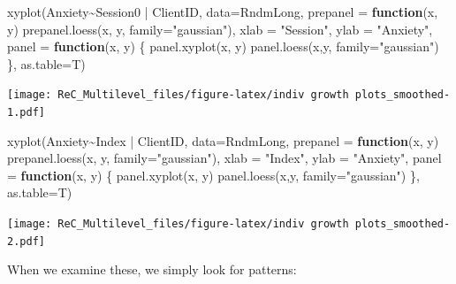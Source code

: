 \documentclass[
  11pt,
]{book}
\newenvironment{Shaded}{\begin{snugshade}}{\end{snugshade}}
\newcommand{\AttributeTok}[1]{\textcolor[rgb]{0.77,0.63,0.00}{#1}}
\newcommand{\ControlFlowTok}[1]{\textcolor[rgb]{0.13,0.29,0.53}{\textbf{#1}}}
\newcommand{\FunctionTok}[1]{\textcolor[rgb]{0.00,0.00,0.00}{#1}}
\newcommand{\NormalTok}[1]{#1}
\newcommand{\SpecialCharTok}[1]{\textcolor[rgb]{0.00,0.00,0.00}{#1}}
\newcommand{\StringTok}[1]{\textcolor[rgb]{0.31,0.60,0.02}{#1}}
\begin{document}
\begin{Shaded}
\begin{Highlighting}[]
\FunctionTok{xyplot}\NormalTok{(Anxiety}\SpecialCharTok{\textasciitilde{}}\NormalTok{Session0 }\SpecialCharTok{|}\NormalTok{ ClientID, }\AttributeTok{data=}\NormalTok{RndmLong,}
  \AttributeTok{prepanel =} \ControlFlowTok{function}\NormalTok{(x, y) }\FunctionTok{prepanel.loess}\NormalTok{(x, y, }\AttributeTok{family=}\StringTok{"gaussian"}\NormalTok{),}
  \AttributeTok{xlab =} \StringTok{"Session"}\NormalTok{, }\AttributeTok{ylab =} \StringTok{"Anxiety"}\NormalTok{,}
  \AttributeTok{panel =} \ControlFlowTok{function}\NormalTok{(x, y) \{}
  \FunctionTok{panel.xyplot}\NormalTok{(x, y)}
  \FunctionTok{panel.loess}\NormalTok{(x,y, }\AttributeTok{family=}\StringTok{"gaussian"}\NormalTok{) \},}
   \AttributeTok{as.table=}\NormalTok{T)}
\end{Highlighting}
\end{Shaded}

\texttt{[image: ReC\_Multilevel\_files/figure-latex/indiv growth plots\_smoothed-1.pdf]}

\begin{Shaded}
\begin{Highlighting}[]
\FunctionTok{xyplot}\NormalTok{(Anxiety}\SpecialCharTok{\textasciitilde{}}\NormalTok{Index }\SpecialCharTok{|}\NormalTok{ ClientID, }\AttributeTok{data=}\NormalTok{RndmLong,}
  \AttributeTok{prepanel =} \ControlFlowTok{function}\NormalTok{(x, y) }\FunctionTok{prepanel.loess}\NormalTok{(x, y, }\AttributeTok{family=}\StringTok{"gaussian"}\NormalTok{),}
  \AttributeTok{xlab =} \StringTok{"Index"}\NormalTok{, }\AttributeTok{ylab =} \StringTok{"Anxiety"}\NormalTok{,}
  \AttributeTok{panel =} \ControlFlowTok{function}\NormalTok{(x, y) \{}
  \FunctionTok{panel.xyplot}\NormalTok{(x, y)}
  \FunctionTok{panel.loess}\NormalTok{(x,y, }\AttributeTok{family=}\StringTok{"gaussian"}\NormalTok{) \},}
   \AttributeTok{as.table=}\NormalTok{T)}
\end{Highlighting}
\end{Shaded}

\texttt{[image: ReC\_Multilevel\_files/figure-latex/indiv growth plots\_smoothed-2.pdf]}

When we examine these, we simply look for patterns:
\end{document}
